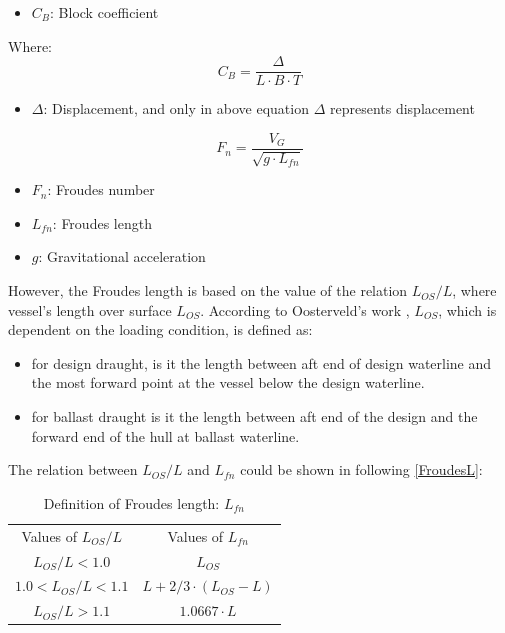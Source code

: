 \begin{itemize}
    \item $C_{B}$: Block coefficient
\end{itemize}
Where:
\begin{equation*}
    C_{B}=\frac{\Delta}{L \cdot B \cdot T}
\end{equation*}
\begin{itemize}
    \item $\Delta$: Displacement, and only in above equation $\Delta$ represents displacement
\end{itemize}
\begin{equation*}
    F_{n}=\frac{V_{G}}{\sqrt{g \cdot L_{f n}}}
    \label{froudesnumber}
\end{equation*}
\begin{itemize}
    \item $F_{n}$: Froudes number
    \item $L_{f n}$: Froudes length
    \item $g$: Gravitational acceleration
\end{itemize}
However, the Froudes length is based on the value of the relation $L_{O S} / L$, where vessel's length over surface $L_{OS}$. According to Oosterveld's work \cite{oosterveld1975further}, $L_{O S}$, which is dependent on the loading condition, is defined as:
\begin{itemize}
    \item for design draught, is it the length between aft end of design waterline and the most forward point at the vessel below the design waterline.
    \item for ballast draught is it the length between aft end of the design and the forward end of the hull at ballast waterline.
\end{itemize}
The relation between $L_{O S} / L$ and $L_{f n}$ could be shown in following \autoref{FroudesL}:
\begin{table}[H]
    \begin{center}
        \caption{Definition of Froudes length: $L_{f n}$}
        \label{FroudesL}
        \begin{tabular}{c|c}
            \hline
            Values of $L_{O S} / L$ & Values of $L_{f n}$  \\ 
            \cline{1-2}
            $L_{O S} / L<1.0$          & $L_{O S}$                 \\ 
            \cline{1-2}
            $1.0<L_{O S} / L<1.1$   & $L+2 / 3 \cdot \left(L_{O S}-L\right)$\\ 
            \cline{1-2}
            $L_{O S} / L>1.1$          & $1.0667 \cdot L$   \\
            \hline   
        \end{tabular}
    \end{center}
\end{table}
